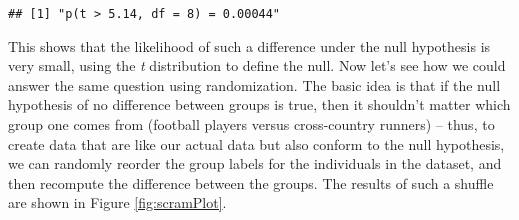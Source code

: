 \documentclass[]{book}
\newenvironment{Shaded}{\begin{snugshade}}{\end{snugshade}}
\newcommand{\KeywordTok}[1]{\textcolor[rgb]{0.13,0.29,0.53}{\textbf{#1}}}
\newcommand{\DataTypeTok}[1]{\textcolor[rgb]{0.13,0.29,0.53}{#1}}
\newcommand{\StringTok}[1]{\textcolor[rgb]{0.31,0.60,0.02}{#1}}
\newcommand{\CommentTok}[1]{\textcolor[rgb]{0.56,0.35,0.01}{\textit{#1}}}
\newcommand{\OperatorTok}[1]{\textcolor[rgb]{0.81,0.36,0.00}{\textbf{#1}}}
\newcommand{\NormalTok}[1]{#1}
\theoremstyle{definition}
\theoremstyle{definition}
\theoremstyle{definition}
\theoremstyle{remark}
\begin{document}
\begin{verbatim}
## [1] "p(t > 5.14, df = 8) = 0.00044"
\end{verbatim}

This shows that the likelihood of such a difference under the null
hypothesis is very small, using the \emph{t} distribution to define the
null. Now let's see how we could answer the same question using
randomization. The basic idea is that if the null hypothesis of no
difference between groups is true, then it shouldn't matter which group
one comes from (football players versus cross-country runners) -- thus,
to create data that are like our actual data but also conform to the
null hypothesis, we can randomly reorder the group labels for the
individuals in the dataset, and then recompute the difference between
the groups. The results of such a shuffle are shown in Figure
\ref{fig:scramPlot}.

\begin{Shaded}
\end{Shaded}
\end{document}
